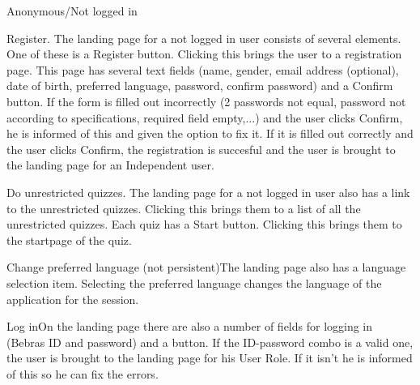 \begin{section}{Anonymous/Not logged in}


    \begin{subsection}{Register.} The landing page for a not logged in user consists of several elements. One of these is a Register button. Clicking this brings the user to a registration page. This page has several text fields (name, gender, email address (optional), date of birth, preferred language, password, confirm password) and a Confirm button. If the form is filled out incorrectly (2 passwords not equal, password not according to specifications, required field empty,...) and the user clicks Confirm, he is informed of this and given the option to fix it. If it is filled out correctly and the user clicks Confirm, the registration is succesful and the user is brought to the landing page for an Independent user.\end{subsection}
	\begin{subsection}{Do unrestricted quizzes.} The landing page for a not logged in user also has a link to the unrestricted quizzes. Clicking this brings them to a list of all the unrestricted quizzes. Each quiz has a Start button. Clicking this brings them to the startpage of the quiz.\end{subsection}
    \begin{subsection}{Change preferred language (not persistent)}The landing page also has a language selection item. Selecting the preferred language changes the language of the application for the session.\end{subsection}
    \begin{subsection}{Log in}On the landing page there are also a number of fields for logging in (Bebras ID and password) and a button. If the ID-password combo is a valid one, the user is brought to the landing page for his User Role. If it isn't he is informed of this so he can fix the errors. \end{subsection}


\end{section}
